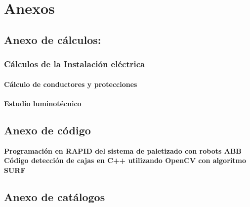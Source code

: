 \newpage \section{Anexos}

   
\subsection{Anexo de cálculos:}

\subsubsection{Cálculos de la Instalación eléctrica}
\paragraph{Cálculo de conductores y protecciones}
\paragraph{Estudio luminotécnico}

\newpage
\subsection{Anexo de código}
\textbf{Programación en RAPID del sistema de paletizado con robots ABB}
\textbf{Código detección de cajas en C++ utilizando OpenCV con algoritmo SURF}



\newpage
\subsection{Anexo de catálogos}
